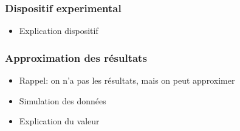 \documentclass{beamer}
\begin{document}
\begin{frame}
\frametitle{Dispositif experimental}

\begin{itemize}
	\item{Explication dispositif}
	
\end{itemize}	
	
\end{frame}





\begin{frame}
\frametitle{Approximation des résultats}

\begin{itemize}
	\item{Rappel: on n'a pas les résultats, mais on peut approximer}
	\item{Simulation des données}
	\item{Explication du valeur}
	
\end{itemize}
\end{frame}
\end{document}
